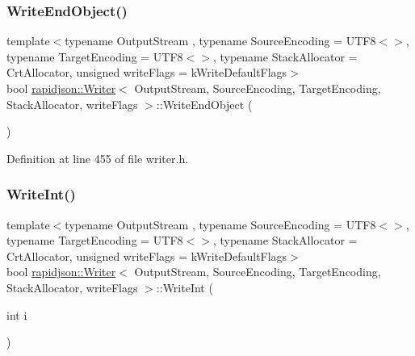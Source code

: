\subsubsection{\texorpdfstring{WriteEndObject()}{WriteEndObject()}}
{\footnotesize\ttfamily template$<$typename Output\+Stream , typename Source\+Encoding  = U\+T\+F8$<$$>$, typename Target\+Encoding  = U\+T\+F8$<$$>$, typename Stack\+Allocator  = Crt\+Allocator, unsigned write\+Flags = k\+Write\+Default\+Flags$>$ \\
bool \mbox{\hyperlink{classrapidjson_1_1_writer}{rapidjson\+::\+Writer}}$<$ Output\+Stream, Source\+Encoding, Target\+Encoding, Stack\+Allocator, write\+Flags $>$\+::Write\+End\+Object (\begin{DoxyParamCaption}{ }\end{DoxyParamCaption})\hspace{0.3cm}{\ttfamily [protected]}}



Definition at line 455 of file writer.\+h.


\begin{DoxyCode}{0}

\end{DoxyCode}
\mbox{\label{classrapidjson_1_1_writer_aca40d77c14bf6911c03b5d4b23283e02}} 
\subsubsection{\texorpdfstring{WriteInt()}{WriteInt()}\hspace{0.1cm}{\footnotesize\ttfamily [1/2]}}
{\footnotesize\ttfamily template$<$typename Output\+Stream , typename Source\+Encoding  = U\+T\+F8$<$$>$, typename Target\+Encoding  = U\+T\+F8$<$$>$, typename Stack\+Allocator  = Crt\+Allocator, unsigned write\+Flags = k\+Write\+Default\+Flags$>$ \\
bool \mbox{\hyperlink{classrapidjson_1_1_writer}{rapidjson\+::\+Writer}}$<$ Output\+Stream, Source\+Encoding, Target\+Encoding, Stack\+Allocator, write\+Flags $>$\+::Write\+Int (\begin{DoxyParamCaption}\item[{int}]{i }\end{DoxyParamCaption})\hspace{0.3cm}{\ttfamily [protected]}}



